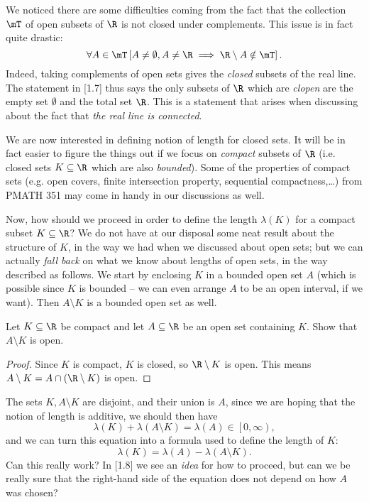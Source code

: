 \documentclass[pmath450]{subfiles}
\begin{document}
    We noticed there are some difficulties coming from the fact that the collection $\mT$ of open subsets of $\R$ is not closed under complements. This issue is in fact quite drastic:
    \begin{equation}
        \forall A\in\mT\left[ A\neq\emptyset,A\neq\R\implies\R\setminus A\notin\mT \right].
    \end{equation}
    Indeed, taking complements of open sets gives the \textit{closed} subsets of the real line. The statement in [1.7] thus says the only subsets of $\R$ which are \textit{clopen} are the empty set $\emptyset$ and the total set $\R$. This is a statement that arises when discussing about the fact that \textit{the real line is connected}.

    We are now interested in defining notion of length for closed sets. It will be in fact easier to figure the things out if we focus on \textit{compact} subsets of $\R$ (i.e. closed sets $K\subseteq\R$ which are also \textit{bounded}). Some of the properties of compact sets (e.g. open covers, finite intersection property, sequential compactness,\ldots) from PMATH 351 may come in handy in our discussions as well.

    Now, how should we proceed in order to define the length $\lambda\left( K \right)$ for a compact subset $K\subseteq\R$? We do not have at our disposal some neat result about the structure of $K$, in the way we had when we discussed about open sets; but we can actually \textit{fall back} on what we know about lengths of open sets, in the way described as follows. We start by enclosing $K$ in a bounded open set $A$ (which is possible since $K$ is bounded -- we can even arrange $A$ to be an open interval, if we want). Then $A\setminus K$ is a bounded open set as well.

    \begin{exercise}{}
        Let $K\subseteq\R$ be compact and let $A\subseteq\R$ be an open set containing $K$. Show that $A\setminus K$ is open.
    \end{exercise}

    \begin{proof}
        Since $K$ is compact, $K$ is closed, so $\R\setminus K$ is open. This means $A\setminus K = A\cap\left( \R\setminus K \right)$ is open.
    \end{proof}
    
    \np The sets $K,A\setminus K$ are disjoint, and their union is $A$, since we are hoping that the notion of length is additive, we should then have
    \begin{equation*}
        \lambda\left( K \right)+\lambda\left( A\setminus K \right)=\lambda\left( A \right)\in\left[ 0,\infty \right),
    \end{equation*}
    and we can turn this equation into a formula used to define the length of $K$:
    \begin{equation}
        \lambda\left( K \right)=\lambda\left( A \right)-\lambda\left( A\setminus K \right).
    \end{equation}
    Can this really work? In [1.8] we see an \textit{idea} for how to proceed, but can we be really sure that the right-hand side of the equation does not depend on how $A$ was chosen?
\end{document}
